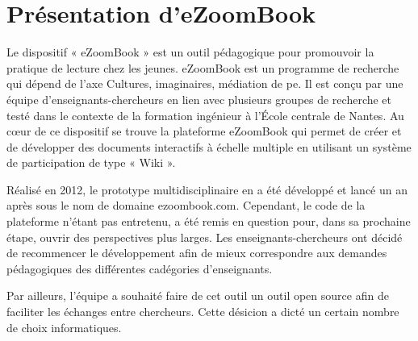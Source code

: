 \section{Présentation d'eZoomBook}

Le dispositif « eZoomBook » est un outil pédagogique pour promouvoir la pratique de lecture chez les jeunes. eZoomBook est un programme de recherche qui dépend de l'axe Cultures, imaginaires, médiation de pe. Il est conçu par une équipe d’enseignants-chercheurs en lien avec plusieurs groupes de recherche et testé dans le contexte de la formation ingénieur à l’École centrale de Nantes. Au cœur de ce dispositif se trouve la plateforme eZoomBook qui permet de créer et de développer des documents interactifs à échelle multiple en utilisant un système de participation de type « Wiki ». 

Réalisé en 2012, le prototype multidisciplinaire en a été développé et lancé un an après sous le nom de domaine ezoombook.com. Cependant, le code de la plateforme n'étant pas entretenu, a été remis en question pour, dans sa prochaine étape, ouvrir des perspectives plus larges. Les enseignants-chercheurs ont décidé de recommencer le développement afin de mieux correspondre aux demandes pédagogiques des différentes cadégories d'enseignants.

Par ailleurs, l'équipe a souhaité faire de cet outil un outil open source afin de faciliter les échanges entre chercheurs. Cette désicion a dicté un certain nombre de choix informatiques.